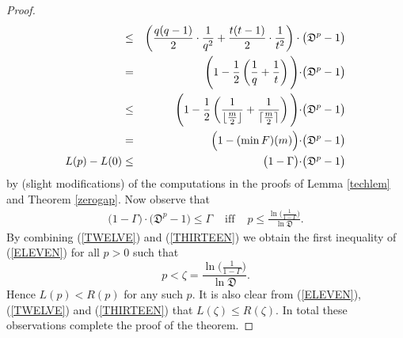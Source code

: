 \documentclass[10pt]{amsart}
\theoremstyle{definition}
\theoremstyle{remark}
\begin{document}
\begin{proof}
\begin{eqnarray}
& \leq & \left( \frac{q(q-1)}{2} \cdot \frac{1}{q^{2}} + \frac{t(t-1)}{2} \cdot \frac{1}{t^{2}} \right)
\cdot \bigl( \mathfrak{D}^{p} - 1 \bigl) \nonumber \\
& = & \Biggl( 1 - \frac{1}{2} \left( \frac{1}{q} + \frac{1}{t} \right) \Biggl)
\cdot \bigl( \mathfrak{D}^{p} - 1 \bigl) \nonumber \\
& \leq & \Biggl( 1 - \frac{1}{2} \left( \frac{1}{\lfloor \frac{m}{2} \rfloor}
+ \frac{1}{\lceil \frac{m}{2} \rceil} \right) \Biggl)
\cdot \bigl( \mathfrak{D}^{p} - 1 \bigl) \nonumber \\
& = & \Bigl( 1 - (\min F)(m) \Bigl) \cdot \bigl( \mathfrak{D}^{p} - 1 \bigl) \nonumber \\
L(p) - L(0) & \leq & \bigl( 1 - \Gamma \bigl) \cdot \bigl( \mathfrak{D}^{p} - 1 \bigl) \nonumber
\end{eqnarray}
by (slight modifications) of the computations in the proofs of Lemma \ref{techlem} and Theorem \ref{zerogap}.
Now observe that
\begin{eqnarray}\label{THIRTEEN}
\bigl( 1 - \Gamma \bigl) \cdot \bigl( \mathfrak{D}^{p} - 1 \bigl) \leq \Gamma
& \text{ iff } & p \leq \frac{\ln \bigl( \frac{1}{1 - \Gamma} \bigl)}{\ln \mathfrak{D}}.
\end{eqnarray}
By combining (\ref{TWELVE}) and (\ref{THIRTEEN}) we obtain the first inequality of (\ref{ELEVEN})
for all $p > 0$ such that $$p < \zeta = \frac{\ln \bigl( \frac{1}{1 - \Gamma} \bigl)}{\ln \mathfrak{D}}.$$
Hence $L(p) < R(p)$ for any such $p$.
It is also clear from (\ref{ELEVEN}), (\ref{TWELVE}) and (\ref{THIRTEEN}) that $L(\zeta) \leq R(\zeta)$.
In total these observations complete the proof of the theorem.
\end{proof}
\end{document}
